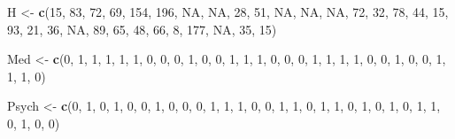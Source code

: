 \documentclass[]{tufte-handout}
\newenvironment{Shaded}{}{}
\newcommand{\KeywordTok}[1]{\textbf{{#1}}}
\newcommand{\DecValTok}[1]{{#1}}
\newcommand{\StringTok}[1]{{#1}}
\newcommand{\OtherTok}[1]{{#1}}
\newcommand{\NormalTok}[1]{{#1}}
\begin{document}
\begin{Shaded}
\begin{Highlighting}[]
\NormalTok{H <-}\StringTok{ }\KeywordTok{c}\NormalTok{(}\DecValTok{15}\NormalTok{, }\DecValTok{83}\NormalTok{, }\DecValTok{72}\NormalTok{, }\DecValTok{69}\NormalTok{, }\DecValTok{154}\NormalTok{, }\DecValTok{196}\NormalTok{, }\OtherTok{NA}\NormalTok{, }\OtherTok{NA}\NormalTok{, }\DecValTok{28}\NormalTok{, }\DecValTok{51}\NormalTok{, }\OtherTok{NA}\NormalTok{, }\OtherTok{NA}\NormalTok{, }\OtherTok{NA}\NormalTok{, }\DecValTok{72}\NormalTok{, }\DecValTok{32}\NormalTok{, }\DecValTok{78}\NormalTok{, }
    \DecValTok{44}\NormalTok{, }\DecValTok{15}\NormalTok{, }\DecValTok{93}\NormalTok{, }\DecValTok{21}\NormalTok{, }\DecValTok{36}\NormalTok{, }\OtherTok{NA}\NormalTok{, }\DecValTok{89}\NormalTok{, }\DecValTok{65}\NormalTok{, }\DecValTok{48}\NormalTok{, }\DecValTok{66}\NormalTok{, }\DecValTok{8}\NormalTok{, }\DecValTok{177}\NormalTok{, }\OtherTok{NA}\NormalTok{, }\DecValTok{35}\NormalTok{, }\DecValTok{15}\NormalTok{)}

\NormalTok{Med <-}\StringTok{ }\KeywordTok{c}\NormalTok{(}\DecValTok{0}\NormalTok{, }\DecValTok{1}\NormalTok{, }\DecValTok{1}\NormalTok{, }\DecValTok{1}\NormalTok{, }\DecValTok{1}\NormalTok{, }\DecValTok{1}\NormalTok{, }\DecValTok{0}\NormalTok{, }\DecValTok{0}\NormalTok{, }\DecValTok{0}\NormalTok{, }\DecValTok{1}\NormalTok{, }\DecValTok{0}\NormalTok{, }\DecValTok{0}\NormalTok{, }\DecValTok{1}\NormalTok{, }\DecValTok{1}\NormalTok{, }\DecValTok{1}\NormalTok{, }\DecValTok{0}\NormalTok{, }\DecValTok{0}\NormalTok{, }\DecValTok{0}\NormalTok{, }\DecValTok{1}\NormalTok{, }\DecValTok{1}\NormalTok{, }\DecValTok{1}\NormalTok{, }
    \DecValTok{1}\NormalTok{, }\DecValTok{0}\NormalTok{, }\DecValTok{0}\NormalTok{, }\DecValTok{1}\NormalTok{, }\DecValTok{0}\NormalTok{, }\DecValTok{0}\NormalTok{, }\DecValTok{1}\NormalTok{, }\DecValTok{1}\NormalTok{, }\DecValTok{1}\NormalTok{, }\DecValTok{0}\NormalTok{)}

\NormalTok{Psych <-}\StringTok{ }\KeywordTok{c}\NormalTok{(}\DecValTok{0}\NormalTok{, }\DecValTok{1}\NormalTok{, }\DecValTok{0}\NormalTok{, }\DecValTok{1}\NormalTok{, }\DecValTok{0}\NormalTok{, }\DecValTok{0}\NormalTok{, }\DecValTok{1}\NormalTok{, }\DecValTok{0}\NormalTok{, }\DecValTok{0}\NormalTok{, }\DecValTok{0}\NormalTok{, }\DecValTok{1}\NormalTok{, }\DecValTok{1}\NormalTok{, }\DecValTok{1}\NormalTok{, }\DecValTok{0}\NormalTok{, }\DecValTok{0}\NormalTok{, }\DecValTok{1}\NormalTok{, }\DecValTok{1}\NormalTok{, }\DecValTok{0}\NormalTok{, }\DecValTok{1}\NormalTok{, }\DecValTok{1}\NormalTok{, }
    \DecValTok{0}\NormalTok{, }\DecValTok{1}\NormalTok{, }\DecValTok{0}\NormalTok{, }\DecValTok{1}\NormalTok{, }\DecValTok{0}\NormalTok{, }\DecValTok{1}\NormalTok{, }\DecValTok{1}\NormalTok{, }\DecValTok{0}\NormalTok{, }\DecValTok{1}\NormalTok{, }\DecValTok{0}\NormalTok{, }\DecValTok{0}\NormalTok{)}


\end{Highlighting}
\end{Shaded}
\end{document}
